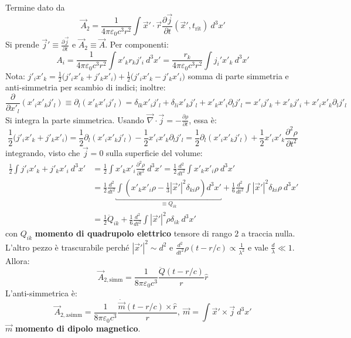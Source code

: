 \documentclass[a4paper]{scrartcl}
\numberwithin{equation}{subsection}
\theoremstyle{style1}
\begin{document}
Termine dato da 
\[
\vec{A}_2 = \frac{1}{4\pi \varepsilon _0 c^3 r^2}  \int \vec{x}' \cdot \vec{r} \frac{\partial \vec{j}}{\partial t} (\vec{x}', t_\text{rit}) \ d^3 x' 
\] 
Si prende $\vec{j}' \equiv \frac{\partial \vec{j}}{\partial t} $ e $\vec{A}_2 \equiv \vec{A}$. Per componenti:
\[
A_i = \frac{1}{4\pi \varepsilon _0 c^3 r^2} \int x'_k r_k j'_i \ d^3 x' = \frac{r_k}{4\pi \varepsilon _0 c^3 r^2}\int j_i ' x'_k \ d^3 x' 
\] 
Nota: $j'_i x'_k = \frac{1}{2}\big(j'_i x'_k + j'_k x'_i\big) + \frac{1}{2}\big(j'_i x'_k - j'_k x'_i\big)$ somma di parte simmetria e anti-simmetria per scambio di indici; inoltre:
\[
\frac{\partial}{\partial x'_l}(x'_ix'_k j'_l)\equiv \partial _l (x'_k x'_i j'_l ) = \delta _{lk} x'_i j'_l + \delta _{li} x'_k j'_l + x'_k x'_i \partial _l j'_l= x'_i j'_k + x'_k j'_i + x'_i x'_k \partial _l j'_l
\] 
Si integra la parte simmetrica. Usando $\vec{\nabla }\cdot \vec{j} = - \frac{\partial \rho }{\partial t} $, essa \`e:
\[
\frac{1}{2}\big(j'_i x'_k + j'_k x'_i\big) = \frac{1}{2} \partial _l(x'_i x'_k j'_l) - \frac{1}{2} x'_i x'_k \partial _l j'_l= \frac{1}{2} \partial _l(x'_i x'_k j'_l) + \frac{1}{2} x'_i x'_k \frac{\partial ^2 \rho }{\partial t^2} 
\] 
integrando, visto che $\vec{j}=0$ sulla superficie del volume:
\begin{equation}
	\begin{split}
		\frac{1}{2}\int j'_i x'_k + j'_k x'_i \ d^3x'&= \frac{1}{2} \int x'_k x'_i \frac{\partial ^2 \rho }{\partial t^2} \ d^3x' = \frac{1}{2} \frac{d ^2}{d t^2} \int x'_k x'_i \rho  \ d^3 x'\\
							     &= \frac{1}{2} \frac{d ^2}{d t^2} \underbracket{\int \left(x'_k x'_i \rho  - \frac{1}{3} \left\lvert \vec{x}' \right\rvert ^2 \delta _{ki} \rho \right) d^3x'}_{\equiv Q_{ik} }  + \frac{1}{6} \frac{d ^2}{d t^2} \int \left\lvert \vec{x}' \right\rvert ^2 \delta _{ki} \rho \ d^ 3 x'  \\
							     &=\frac{1}{2}\ddot{Q}_{ik} + \frac{1}{6} \frac{d ^2}{d t^2} \int \left\lvert \vec{x}' \right\rvert ^2 \rho  \delta _{ik} \ d^3 x' 
	\end{split}
\end{equation}
con $Q_{ik} $ \textbf{momento di quadrupolo elettrico} tensore di rango $2$ a traccia nulla. L'altro pezzo \`e trascurabile perch\'e $\left\lvert \vec{x}' \right\rvert ^2 \sim d^2$ e $\frac{d ^2}{d t^2} \rho (t - r / c) \propto \frac{1}{\lambda ^2}$ e vale $\frac{d}{\lambda }\ll 1$. Allora:
\begin{equation}
	\vec{A}_{2, \text{simm}} = \frac{1}{8 \pi \varepsilon _0 c^3} \frac{\ddot{Q}(t - r/c)}{r} \hat{r}
\end{equation}
L'anti-simmetrica \`e:
\begin{equation}
	\vec{A}_{2,\text{asimm}} = \frac{1}{8 \pi \varepsilon _0 c^3} \frac{\dot{\vec{m}}(t- r /c) \times \hat{r}}{r}, \ \vec{m}=\int \vec{x}' \times  \vec{j} \ d^3x' 
\end{equation}
$\vec{m}$ \textbf{momento di dipolo magnetico}. 
\end{document}

